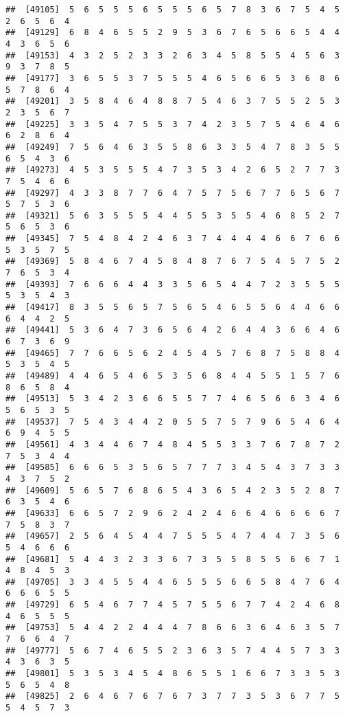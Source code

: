 \documentclass[
]{book}
\begin{document}
\begin{verbatim}
##  [49105]  5  6  5  5  5  6  5  5  5  6  5  7  8  3  6  7  5  4  5  2  6  5  6  4
##  [49129]  6  8  4  6  5  5  2  9  5  3  6  7  6  5  6  6  5  4  4  4  3  6  5  6
##  [49153]  4  3  2  5  2  3  3  2  6  3  4  5  8  5  5  4  5  6  3  9  3  7  8  5
##  [49177]  3  6  5  5  3  7  5  5  5  4  6  5  6  6  5  3  6  8  6  5  7  8  6  4
##  [49201]  3  5  8  4  6  4  8  8  7  5  4  6  3  7  5  5  2  5  3  2  3  5  6  7
##  [49225]  3  3  5  4  7  5  5  3  7  4  2  3  5  7  5  4  6  4  6  6  2  8  6  4
##  [49249]  7  5  6  4  6  3  5  5  8  6  3  3  5  4  7  8  3  5  5  6  5  4  3  6
##  [49273]  4  5  3  5  5  5  4  7  3  5  3  4  2  6  5  2  7  7  3  7  5  4  6  6
##  [49297]  4  3  3  8  7  7  6  4  7  5  7  5  6  7  7  6  5  6  7  5  7  5  3  6
##  [49321]  5  6  3  5  5  5  4  4  5  5  3  5  5  4  6  8  5  2  7  5  6  5  3  6
##  [49345]  7  5  4  8  4  2  4  6  3  7  4  4  4  4  6  6  7  6  6  5  3  5  7  5
##  [49369]  5  8  4  6  7  4  5  8  4  8  7  6  7  5  4  5  7  5  2  7  6  5  3  4
##  [49393]  7  6  6  6  4  4  3  3  5  6  5  4  4  7  2  3  5  5  5  5  3  5  4  3
##  [49417]  8  3  5  5  6  5  7  5  6  5  4  6  5  5  6  4  4  6  6  6  4  4  2  5
##  [49441]  5  3  6  4  7  3  6  5  6  4  2  6  4  4  3  6  6  4  6  6  7  3  6  9
##  [49465]  7  7  6  6  5  6  2  4  5  4  5  7  6  8  7  5  8  8  4  5  3  5  4  5
##  [49489]  4  4  6  5  4  6  5  3  5  6  8  4  4  5  5  1  5  7  6  8  6  5  8  4
##  [49513]  5  3  4  2  3  6  6  5  5  7  7  4  6  5  6  6  3  4  6  5  6  5  3  5
##  [49537]  7  5  4  3  4  4  2  0  5  5  7  5  7  9  6  5  4  6  4  6  9  4  5  5
##  [49561]  4  3  4  4  6  7  4  8  4  5  5  3  3  7  6  7  8  7  2  7  5  3  4  4
##  [49585]  6  6  6  5  3  5  6  5  7  7  7  3  4  5  4  3  7  3  3  4  3  7  5  2
##  [49609]  5  6  5  7  6  8  6  5  4  3  6  5  4  2  3  5  2  8  7  6  3  5  4  6
##  [49633]  6  6  5  7  2  9  6  2  4  2  4  6  6  4  6  6  6  6  7  7  5  8  3  7
##  [49657]  2  5  6  4  5  4  4  7  5  5  5  4  7  4  4  7  3  5  6  5  4  6  6  6
##  [49681]  5  4  4  3  2  3  3  6  7  3  5  5  8  5  5  6  6  7  1  4  8  4  5  3
##  [49705]  3  3  4  5  5  4  4  6  5  5  5  6  6  5  8  4  7  6  4  6  6  6  5  5
##  [49729]  6  5  4  6  7  7  4  5  7  5  5  6  7  7  4  2  4  6  8  4  6  5  5  5
##  [49753]  5  4  4  2  2  4  4  4  7  8  6  6  3  6  4  6  3  5  7  7  6  6  4  7
##  [49777]  5  6  7  4  6  5  5  2  3  6  3  5  7  4  4  5  7  3  3  4  3  6  3  5
##  [49801]  5  3  5  3  4  5  4  8  6  5  5  1  6  6  7  3  3  5  3  5  6  5  4  8
##  [49825]  2  6  4  6  7  6  7  6  7  3  7  7  3  5  3  6  7  7  5  5  4  5  7  3

\end{verbatim}
\end{document}
